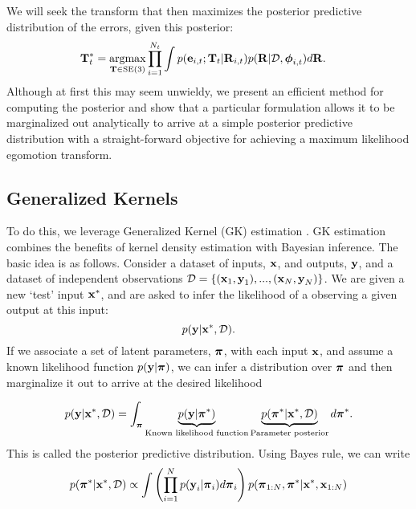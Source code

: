 We will seek the transform that then maximizes the posterior predictive distribution of the errors, given this posterior:
\begin{align}
\label{eq:probe_vo_objective}
  \boldsymbol{\mathbf{T}}_t^* &=  \operatorname*{argmax}_{\boldsymbol{\mathbf{T}}\in\text{SE}(3)} \prod_{i=1}^{N_t} \int p(\boldsymbol{\mathbf{e}}_{i,t}; \boldsymbol{\mathbf{T}}_t |  \boldsymbol{\mathbf{R}}_{i,t}) p(\boldsymbol{\mathbf{R}}|\mathcal{D}, \boldsymbol{\mathbf{\phi}}_{i,t}) d\boldsymbol{\mathbf{R}}.
\end{align}
Although at first this may seem unwieldy, we present an efficient method for computing the posterior and show that a particular formulation allows it to be marginalized out analytically to arrive at a simple posterior predictive distribution with a straight-forward objective for achieving a maximum likelihood egomotion transform.
\subsection{Generalized Kernels}
To do this, we leverage Generalized Kernel (GK) estimation \citep{Vega-Brown2014-sb}. GK estimation combines the benefits of kernel density estimation with Bayesian inference. The basic idea is as follows. 
Consider a dataset of inputs, $\boldsymbol{\mathbf{x}}$, and outputs, $\boldsymbol{\mathbf{y}}$,  and a dataset of independent observations $\mathcal{D} = \{(\boldsymbol{\mathbf{x}}_1, \boldsymbol{\mathbf{y}}_1), ..., (\boldsymbol{\mathbf{x}}_N, \boldsymbol{\mathbf{y}}_N) \}$. We are given a new `test' input $\boldsymbol{\mathbf{x}}^*$, and are asked to infer the likelihood of a observing a given output at this input:
\begin{equation}
p(\boldsymbol{\mathbf{y}} | 	\boldsymbol{\mathbf{x}}^*, \mathcal{D}).
\end{equation}
 If we associate a set of latent parameters, $\boldsymbol{\mathbf{\pi}}$, with each input $\boldsymbol{\mathbf{x}}$, and assume a known likelihood function $p(\boldsymbol{\mathbf{y}}|\boldsymbol{\mathbf{\pi}})$, we can infer a distribution over $\boldsymbol{\mathbf{\pi}}$ and then marginalize it out to arrive at the desired likelihood

\begin{equation}
p(\boldsymbol{\mathbf{y}} | 	\boldsymbol{\mathbf{x}}^*, \mathcal{D}) = \int_{\boldsymbol{\mathbf{\pi}}} \underbrace{p(\boldsymbol{\mathbf{y}} | \boldsymbol{\mathbf{\pi}}^*)}_{\text{Known likelihood function}} \underbrace{p(\boldsymbol{\mathbf{\pi}}^* | \boldsymbol{\mathbf{x}}^*, \mathcal{D})}_{\text{Parameter posterior}} d\boldsymbol{\mathbf{\pi}}^*.
\end{equation}
This is called the posterior predictive distribution. Using Bayes rule, we can write
\begin{equation}
\label{eq:probe_posterior_bayes_rule}
p(\boldsymbol{\mathbf{\pi}}^* | \boldsymbol{\mathbf{x}}^*, \mathcal{D}) \propto \int \left( \prod_{i=1}^N p(\boldsymbol{\mathbf{y}}_i | \boldsymbol{\mathbf{\pi}}_i)d\boldsymbol{\mathbf{\pi}}_i \right) p(\boldsymbol{\mathbf{\pi}}_{1:N}, \boldsymbol{\mathbf{\pi}}^*| \boldsymbol{\mathbf{x}}^*, \boldsymbol{\mathbf{x}}_{1:N})
\end{equation}


